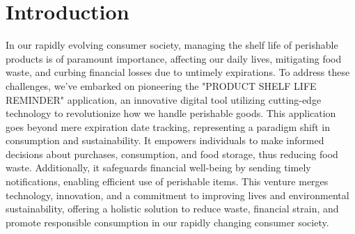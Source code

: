 \chapter{Introduction}\doublespacing

In our rapidly evolving consumer society, managing the shelf life of perishable products is of paramount importance, affecting our daily lives, mitigating food waste, and curbing financial losses due to untimely expirations. To address these challenges, we've embarked on pioneering the "PRODUCT SHELF LIFE REMINDER" application, an innovative digital tool utilizing cutting-edge technology to revolutionize how we handle perishable goods. This application goes beyond mere expiration date tracking, representing a paradigm shift in consumption and sustainability. It empowers individuals to make informed decisions about purchases, consumption, and food storage, thus reducing food waste. Additionally, it safeguards financial well-being by sending timely notifications, enabling efficient use of perishable items. This venture merges technology, innovation, and a commitment to improving lives and environmental sustainability, offering a holistic solution to reduce waste, financial strain, and promote responsible consumption in our rapidly changing consumer society.

